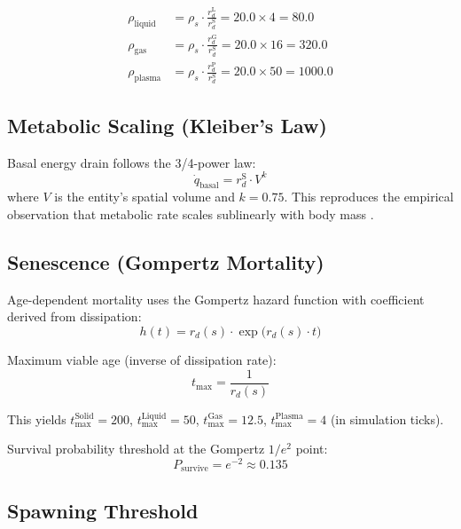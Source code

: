 \documentclass[11pt,a4paper]{article}
\begin{document}
\begin{align}
  \rho_{\text{liquid}} &= \rho_s \cdot \frac{r_d^{\text{L}}}{r_d^{\text{S}}}
    = 20.0 \times 4 = 80.0 \\
  \rho_{\text{gas}} &= \rho_s \cdot \frac{r_d^{\text{G}}}{r_d^{\text{S}}}
    = 20.0 \times 16 = 320.0 \\
  \rho_{\text{plasma}} &= \rho_s \cdot \frac{r_d^{\text{P}}}{r_d^{\text{S}}}
    = 20.0 \times 50 = 1000.0
\end{align}

\subsection{Metabolic Scaling (Kleiber's Law)}

Basal energy drain follows the 3/4-power law:
\begin{equation}
  \dot{q}_{\text{basal}} = r_d^{\text{S}} \cdot V^k
  \label{eq:kleiber}
\end{equation}
where $V$ is the entity's spatial volume and $k = 0.75$.
This reproduces the empirical observation that metabolic rate
scales sublinearly with body mass \citep{kleiber1932body}.

\subsection{Senescence (Gompertz Mortality)}

Age-dependent mortality uses the Gompertz hazard function
with coefficient derived from dissipation:
\begin{equation}
  h(t) = r_d(s) \cdot \exp\!\big(r_d(s) \cdot t\big)
\end{equation}

Maximum viable age (inverse of dissipation rate):
\begin{equation}
  t_{\max} = \frac{1}{r_d(s)}
  \label{eq:max-age}
\end{equation}

This yields $t_{\max}^{\text{Solid}} = 200$,
$t_{\max}^{\text{Liquid}} = 50$,
$t_{\max}^{\text{Gas}} = 12.5$,
$t_{\max}^{\text{Plasma}} = 4$ (in simulation ticks).

Survival probability threshold at the Gompertz $1/e^2$ point:
\begin{equation}
  P_{\text{survive}} = e^{-2} \approx 0.135
\end{equation}

\subsection{Spawning Threshold}
\end{document}
